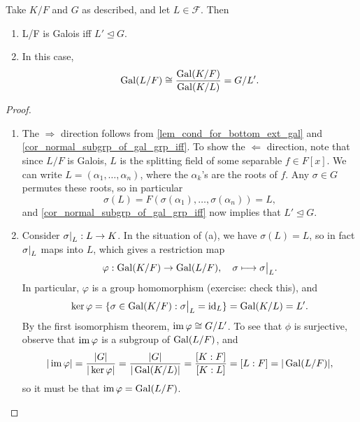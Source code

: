 \begin{proposition}
\label{prop_addendum_fund_thm_of_gal_thy}
    Take $K/F$ and $G$ as described, and let $L \in \mathcal{F}$. Then
    \begin{enumerate}[label=(\alph*)]
        \item L/F is Galois iff $L' \unlhd G$.
        \item In this case,
        \[
            \operatorname{Gal}(L/F) \cong \frac{\operatorname{Gal}(K/F)}{\operatorname{Gal}(K/L)} = G/L'.
        \]
    \end{enumerate}
\end{proposition}

\begin{proof}~
    \begin{enumerate}[label=(\alph*)]
        \item The $\Rightarrow$ direction follows from \cref{lem_cond_for_bottom_ext_gal} and \cref{cor_normal_subgrp_of_gal_grp_iff}. To show the $\Leftarrow$ direction, note that since $L/F$ is Galois, $L$ is the splitting field of some separable $f \in F[x]$. We can write $L = (\alpha_1, \ldots, \alpha_n)$, where the $\alpha_k$'s are the roots of $f$. Any $\sigma \in G$ permutes these roots, so in particular
        \[
            \sigma(L) = F(\sigma(\alpha_1), \ldots, \sigma(\alpha_n)) = L,
        \]
        and \cref{cor_normal_subgrp_of_gal_grp_iff} now implies that $L' \unlhd G$.

        \item Consider $\restr{\sigma}{L}: L \to K$. In the situation of (a), we have $\sigma(L) = L$, so in fact $\restr{\sigma}{L}$ maps into $L$, which gives a restriction map
        \[
            \varphi: \gal(K/F) \to \gal(L/F), \quad \sigma \longmapsto \restr{\sigma}{L}.
        \]
        In particular, $\varphi$ is a group homomorphism (exercise: check this), and
        \[
            \ker{\varphi} = \{\sigma \in \gal(K/F): \restr{\sigma}{L} = \id_L\} = \gal(K/L) = L'.
        \]
        By the first isomorphism theorem, $\operatorname{im}{\varphi} \cong G/L'$. To see that $\phi$ is surjective, observe that $\operatorname{im}{\varphi}$ is a subgroup of $\operatorname{Gal}(L/F)$, and
        \[
            |\operatorname{im}{\varphi}| = \frac{|G|}{|\ker{\varphi}|} = \frac{|G|}{|\operatorname{Gal}(K/L)|} = \frac{[K : F]}{[K : L]} = [L : F] = |\operatorname{Gal}(L/F)|,
        \]
        so it must be that $\operatorname{im}{\varphi} = \operatorname{Gal}(L/F)$.
        \qedhere
    \end{enumerate}
\end{proof}

